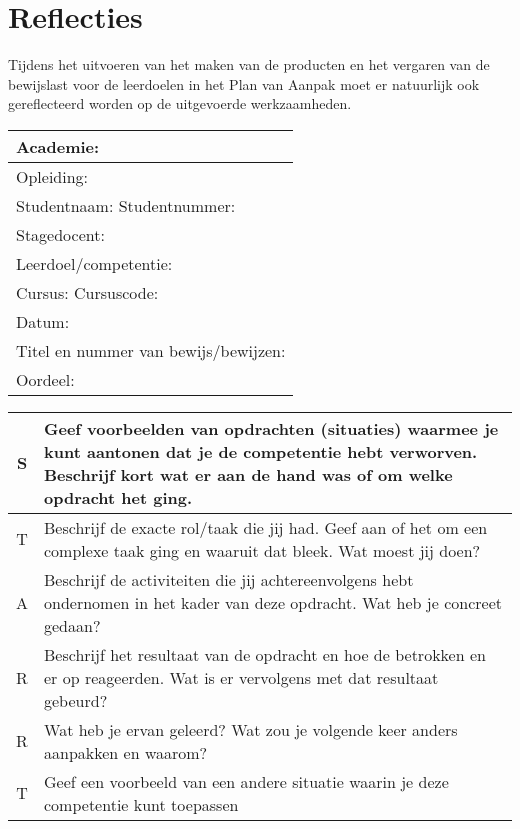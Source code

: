 \section{Reflecties}
Tijdens het uitvoeren van het maken van de producten en het vergaren van de bewijslast voor de leerdoelen in het Plan van Aanpak moet er natuurlijk ook gereflecteerd worden op de uitgevoerde werkzaamheden.


\begin{tabular}{l}
\hline
Academie: \\ \hline
Opleiding: \\ \hline
Studentnaam:         Studentnummer: \\ \hline
Stagedocent: \\ \hline
Leerdoel/competentie: \\ \hline
Cursus:               Cursuscode: \\ \hline 
Datum: \\ \hline
Titel en nummer van bewijs/bewijzen: \\ \hline
Oordeel: \\ \hline
\end{tabular}
\begin{tabular}{c | l}
S & Geef voorbeelden van opdrachten (situaties) waarmee je kunt aantonen dat je de competentie hebt verworven. Beschrijf kort wat er aan de hand was of om welke opdracht het ging. \\ \hline
T & Beschrijf de exacte rol/taak die jij had. Geef aan of het om een complexe taak ging en waaruit dat bleek. Wat moest jij doen? \\ \hline
A & Beschrijf de activiteiten die jij achtereenvolgens hebt ondernomen in het kader van deze opdracht. Wat heb je concreet gedaan? \\ \hline
R & Beschrijf het resultaat van de opdracht en hoe de betrokken en er op reageerden. Wat is er vervolgens met dat resultaat gebeurd? \\ \hline
R & Wat heb je ervan geleerd? Wat zou je volgende keer anders aanpakken en waarom? \\ \hline
T & Geef een voorbeeld van een andere situatie waarin je deze competentie kunt toepassen \\ \hline
\end{tabular}